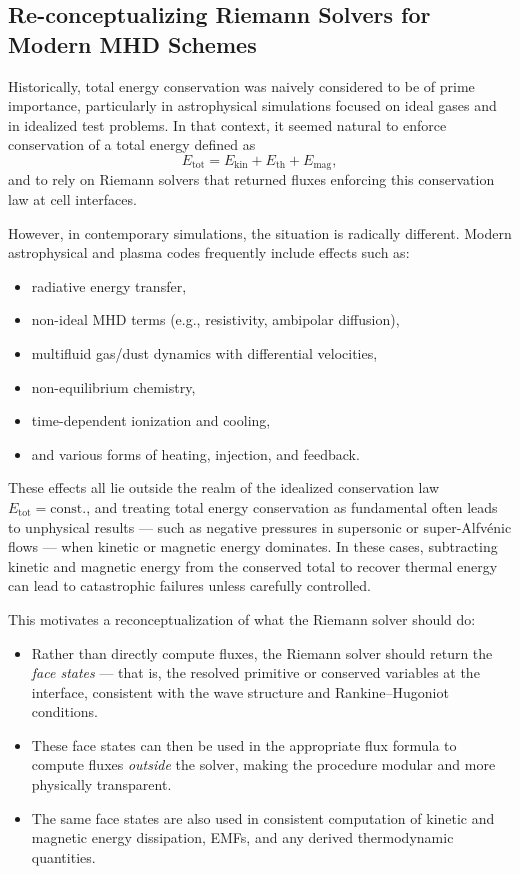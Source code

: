 \documentclass[paper=a4,fontsize=11pt]{scrartcl}
\numberwithin{equation}{section}		%
\numberwithin{figure}{section}			%
\numberwithin{table}{section}				%
\begin{document}
\subsection{Re-conceptualizing Riemann Solvers for Modern MHD Schemes}

Historically, total energy conservation was naively considered to be of prime importance, particularly in astrophysical simulations focused on ideal gases and in idealized test problems. In that context, it seemed natural to enforce conservation of a total energy defined as
\[
E_{\text{tot}} = E_{\text{kin}} + E_{\text{th}} + E_{\text{mag}},
\]
and to rely on Riemann solvers that returned fluxes enforcing this conservation law at cell interfaces.

However, in contemporary simulations, the situation is radically different. Modern astrophysical and plasma codes frequently include effects such as:
\begin{itemize}
  \item radiative energy transfer,
  \item non-ideal MHD terms (e.g., resistivity, ambipolar diffusion),
  \item multifluid gas/dust dynamics with differential velocities,
  \item non-equilibrium chemistry,
  \item time-dependent ionization and cooling,
  \item and various forms of heating, injection, and feedback.
\end{itemize}

These effects all lie outside the realm of the idealized conservation law \( E_{\text{tot}} = \text{const.} \), and treating total energy conservation as fundamental often leads to unphysical results — such as negative pressures in supersonic or super-Alfvénic flows — when kinetic or magnetic energy dominates. In these cases, subtracting kinetic and magnetic energy from the conserved total to recover thermal energy can lead to catastrophic failures unless carefully controlled.

This motivates a reconceptualization of what the Riemann solver should do:

\begin{itemize}
  \item Rather than directly compute fluxes, the Riemann solver should return the \textit{face states} — that is, the resolved primitive or conserved variables at the interface, consistent with the wave structure and Rankine–Hugoniot conditions.
  \item These face states can then be used in the appropriate flux formula to compute fluxes \textit{outside} the solver, making the procedure modular and more physically transparent.
  \item The same face states are also used in consistent computation of kinetic and magnetic energy dissipation, EMFs, and any derived thermodynamic quantities.
\end{itemize}
\end{document}
